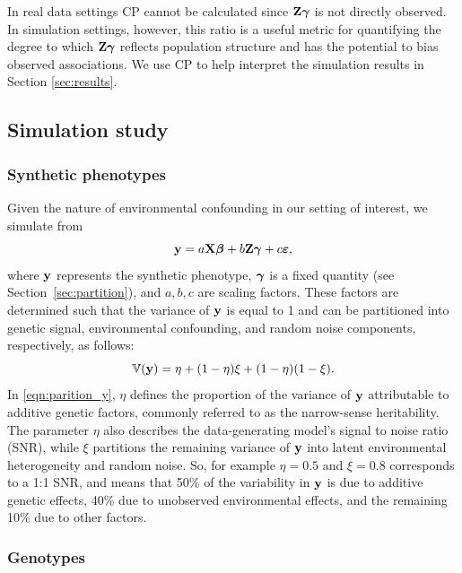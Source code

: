 In real data settings CP cannot be calculated since $\mathbf{Z} \boldsymbol{\gamma}$ is not directly observed. In simulation settings, however, this ratio is a useful metric for quantifying the degree to which $\mathbf{Z} \boldsymbol{\gamma}$ reflects population structure and has the potential to bias observed associations. We use CP to help interpret the simulation results in Section \ref{sec:results}. %

\subsection{Simulation study}

\subsubsection{Synthetic phenotypes}

Given the nature of environmental confounding in our setting of interest, we simulate from
\begin{equation}
    \label{eqn:sim}
    \mathbf{y} = a \mathbf{X} \boldsymbol{\beta}{} + b \mathbf{Z} \boldsymbol{\gamma} + c \boldsymbol{\varepsilon}{},
\end{equation}
where $\mathbf{y}$ represents the synthetic phenotype, $\boldsymbol{\gamma}$ is a fixed quantity (see Section~\ref{sec:partition}), and $a, b, c$ are scaling factors. These factors are determined such that the variance of $\mathbf{y}$ is equal to 1 and can be partitioned into genetic signal, environmental confounding, and random noise components, respectively, as follows:
\begin{equation}
    \label{eqn:parition_y}
    \mathbb{V}(\mathbf{y}) = \eta + (1 - \eta) \xi + (1-\eta)(1-\xi).
\end{equation}
In \eqref{eqn:parition_y}, $\eta$ defines the proportion of the variance of $\mathbf{y}$ attributable to additive genetic factors, commonly referred to as the narrow-sense heritability. %
The parameter $\eta$ also describes the data-generating model's signal to noise ratio (SNR), while $\xi$ partitions the remaining variance of $\mathbf{y}$ into latent environmental heterogeneity and random noise. So, for example $\eta = 0.5$ and $\xi = 0.8$ corresponds to a 1:1 SNR, and means that 50\% of the variability in $\mathbf{y}$ is due to additive genetic effects, 40\% due to unobserved environmental effects, and the remaining 10\% due to other factors.

\subsubsection{Genotypes}
\label{sec:subpopulation_structure}

